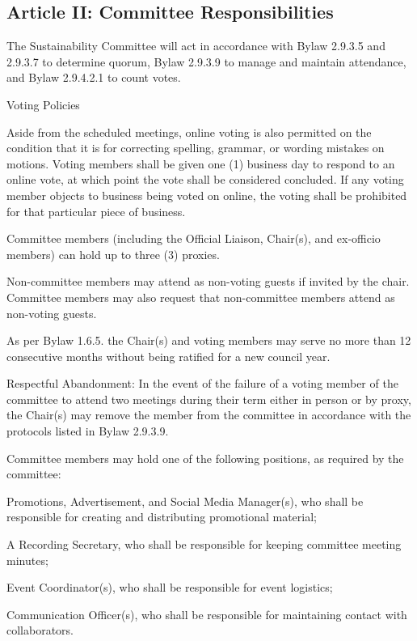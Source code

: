 \subsection{Article II: Committee Responsibilities}
\begin{longenum}[ label*=\thesubsection.\arabic*., align=left] 
\item The Sustainability Committee will act in accordance with Bylaw 2.9.3.5 and 2.9.3.7 to determine quorum, Bylaw 2.9.3.9 to manage and maintain attendance, and Bylaw 2.9.4.2.1 to count votes.
\item Voting Policies
	\begin{longenum}[ label*=\arabic*., align=left]
	\item Aside from the scheduled meetings, online voting is also permitted on the condition that it is for correcting spelling, grammar, or wording mistakes on motions. Voting members shall be given one (1) business day to respond to an online vote, at which point the vote shall be considered concluded. If any voting member objects to business being voted on online, the voting shall be prohibited for that particular piece of business.
	\item Committee members (including the Official Liaison, Chair(s), and ex-officio members) can hold up to three (3) proxies.
	\end{longenum}
\item Non-committee members may attend as non-voting guests if invited by the chair. Committee members may also request that non-committee members attend as non-voting guests.
\item As per Bylaw 1.6.5. the Chair(s) and voting members may serve no more than 12 consecutive months without being ratified for a new council year.
\item Respectful Abandonment: In the event of the failure of a voting member of the committee to attend two meetings during their term either in person or by proxy, the Chair(s) may remove the member from the committee in accordance with the protocols listed in Bylaw 2.9.3.9.
\item Committee members may hold one of the following positions, as required by the committee:
	\begin{longenum}[ label*=\arabic*., align=left]
	\item Promotions, Advertisement, and Social Media Manager(s), who shall be responsible for creating and distributing promotional material;
	\item A Recording Secretary, who shall be responsible for keeping committee meeting minutes;
	\item Event Coordinator(s), who shall be responsible for event logistics;
	\item Communication Officer(s), who shall be responsible for maintaining contact with collaborators.
	\end{longenum}
\end{longenum}

